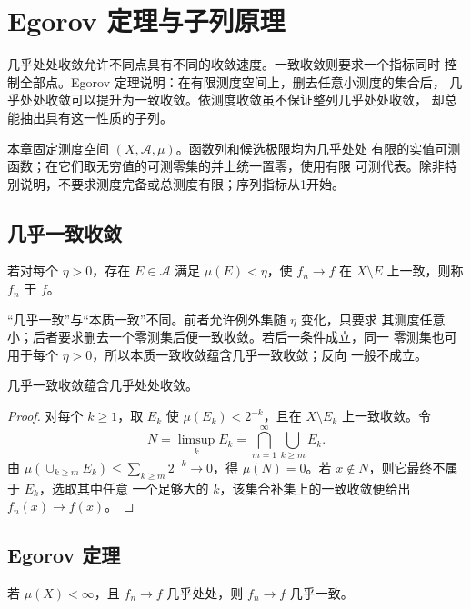 \chapter{Egorov 定理与子列原理}
\label{chap:egorov-subsequence}

几乎处处收敛允许不同点具有不同的收敛速度。一致收敛则要求一个指标同时
控制全部点。Egorov 定理说明：在有限测度空间上，删去任意小测度的集合后，
几乎处处收敛可以提升为一致收敛。依测度收敛虽不保证整列几乎处处收敛，
却总能抽出具有这一性质的子列。

本章固定测度空间 \((X,\mathcal A,\mu)\)。函数列和候选极限均为几乎处处
有限的实值可测函数；在它们取无穷值的可测零集的并上统一置零，使用有限
可测代表。除非特别说明，不要求测度完备或总测度有限；序列指标从1开始。

\section{几乎一致收敛}

\begin{definition}
若对每个 \(\eta>0\)，存在 \(E\in\mathcal A\) 满足
\(\mu(E)<\eta\)，使 \(f_n\to f\) 在 \(X\setminus E\) 上一致，则称
\(f_n\) 于 \(f\)。
\end{definition}

“几乎一致”与“本质一致”不同。前者允许例外集随 \(\eta\) 变化，只要求
其测度任意小；后者要求删去一个零测集后便一致收敛。若后一条件成立，同一
零测集也可用于每个 \(\eta>0\)，所以本质一致收敛蕴含几乎一致收敛；反向
一般不成立。

\begin{proposition}
\label{prop:almost-uniform-implies-ae}
几乎一致收敛蕴含几乎处处收敛。
\end{proposition}

\begin{proof}
对每个 \(k\ge1\)，取 \(E_k\) 使
\(\mu(E_k)<2^{-k}\)，且在 \(X\setminus E_k\) 上一致收敛。令
\[
 N=\limsup_kE_k=\bigcap_{m=1}^{\infty}\bigcup_{k\ge m}E_k.
\]
由
\(\mu(\cup_{k\ge m}E_k)\le\sum_{k\ge m}2^{-k}\to0\)，得
\(\mu(N)=0\)。若 \(x\notin N\)，则它最终不属于 \(E_k\)，选取其中任意
一个足够大的 \(k\)，该集合补集上的一致收敛便给出 \(f_n(x)\to f(x)\)。
\end{proof}

\section{Egorov 定理}

\begin{theorem}[Egorov]
\label{thm:egorov}
若 \(\mu(X)<\infty\)，且 \(f_n\to f\) 几乎处处，则 \(f_n\to f\)
几乎一致。
\end{theorem}

